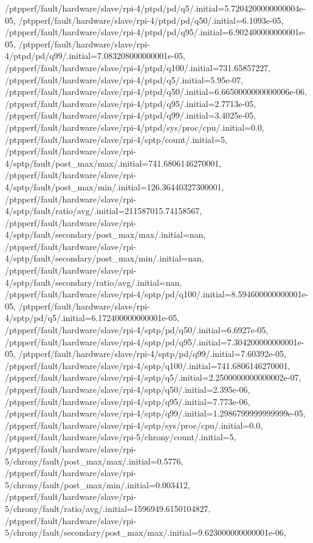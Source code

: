 {    /ptpperf/fault/hardware/slave/rpi-4/ptpd/pd/q5/.initial=5.7204200000000004e-05,
    /ptpperf/fault/hardware/slave/rpi-4/ptpd/pd/q50/.initial=6.1093e-05,
    /ptpperf/fault/hardware/slave/rpi-4/ptpd/pd/q95/.initial=6.902400000000001e-05,
    /ptpperf/fault/hardware/slave/rpi-4/ptpd/pd/q99/.initial=7.083208000000001e-05,
    /ptpperf/fault/hardware/slave/rpi-4/ptpd/q100/.initial=731.65857227,
    /ptpperf/fault/hardware/slave/rpi-4/ptpd/q5/.initial=5.95e-07,
    /ptpperf/fault/hardware/slave/rpi-4/ptpd/q50/.initial=6.6650000000000006e-06,
    /ptpperf/fault/hardware/slave/rpi-4/ptpd/q95/.initial=2.7713e-05,
    /ptpperf/fault/hardware/slave/rpi-4/ptpd/q99/.initial=3.4025e-05,
    /ptpperf/fault/hardware/slave/rpi-4/ptpd/sys/proc/cpu/.initial=0.0,
    /ptpperf/fault/hardware/slave/rpi-4/sptp/count/.initial=5,
    /ptpperf/fault/hardware/slave/rpi-4/sptp/fault/post_max/max/.initial=741.6806146270001,
    /ptpperf/fault/hardware/slave/rpi-4/sptp/fault/post_max/min/.initial=126.36440327300001,
    /ptpperf/fault/hardware/slave/rpi-4/sptp/fault/ratio/avg/.initial=211587015.74158567,
    /ptpperf/fault/hardware/slave/rpi-4/sptp/fault/secondary/post_max/max/.initial=nan,
    /ptpperf/fault/hardware/slave/rpi-4/sptp/fault/secondary/post_max/min/.initial=nan,
    /ptpperf/fault/hardware/slave/rpi-4/sptp/fault/secondary/ratio/avg/.initial=nan,
    /ptpperf/fault/hardware/slave/rpi-4/sptp/pd/q100/.initial=8.594600000000001e-05,
    /ptpperf/fault/hardware/slave/rpi-4/sptp/pd/q5/.initial=6.172400000000001e-05,
    /ptpperf/fault/hardware/slave/rpi-4/sptp/pd/q50/.initial=6.6927e-05,
    /ptpperf/fault/hardware/slave/rpi-4/sptp/pd/q95/.initial=7.304200000000001e-05,
    /ptpperf/fault/hardware/slave/rpi-4/sptp/pd/q99/.initial=7.60392e-05,
    /ptpperf/fault/hardware/slave/rpi-4/sptp/q100/.initial=741.6806146270001,
    /ptpperf/fault/hardware/slave/rpi-4/sptp/q5/.initial=2.2500000000000002e-07,
    /ptpperf/fault/hardware/slave/rpi-4/sptp/q50/.initial=2.395e-06,
    /ptpperf/fault/hardware/slave/rpi-4/sptp/q95/.initial=7.773e-06,
    /ptpperf/fault/hardware/slave/rpi-4/sptp/q99/.initial=1.2986799999999999e-05,
    /ptpperf/fault/hardware/slave/rpi-4/sptp/sys/proc/cpu/.initial=0.0,
    /ptpperf/fault/hardware/slave/rpi-5/chrony/count/.initial=5,
    /ptpperf/fault/hardware/slave/rpi-5/chrony/fault/post_max/max/.initial=0.5776,
    /ptpperf/fault/hardware/slave/rpi-5/chrony/fault/post_max/min/.initial=0.003412,
    /ptpperf/fault/hardware/slave/rpi-5/chrony/fault/ratio/avg/.initial=1596949.6150104827,
    /ptpperf/fault/hardware/slave/rpi-5/chrony/fault/secondary/post_max/max/.initial=9.623000000000001e-06,
}
